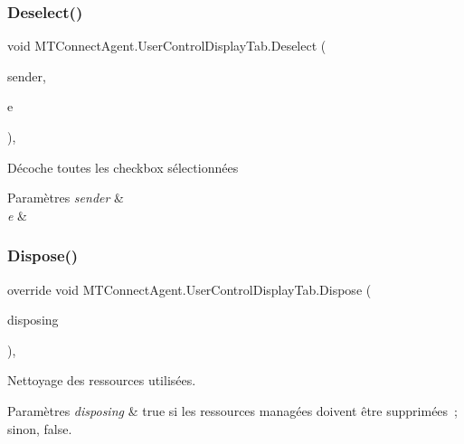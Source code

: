 \subsubsection{\texorpdfstring{Deselect()}{Deselect()}}
{\footnotesize\ttfamily void M\+T\+Connect\+Agent.\+User\+Control\+Display\+Tab.\+Deselect (\begin{DoxyParamCaption}\item[{object}]{sender,  }\item[{Mouse\+Event\+Args}]{e }\end{DoxyParamCaption})\hspace{0.3cm}{\ttfamily [inline]}, {\ttfamily [private]}}



Décoche toutes les checkbox sélectionnées 


\begin{DoxyParams}{Paramètres}
{\em sender} & \\
\hline
{\em e} & \\
\hline
\end{DoxyParams}
\mbox{\label{class_m_t_connect_agent_1_1_user_control_display_tab_a0cfe1921bf9282de4c87b7b3c68bf6e6}} 
\subsubsection{\texorpdfstring{Dispose()}{Dispose()}}
{\footnotesize\ttfamily override void M\+T\+Connect\+Agent.\+User\+Control\+Display\+Tab.\+Dispose (\begin{DoxyParamCaption}\item[{bool}]{disposing }\end{DoxyParamCaption})\hspace{0.3cm}{\ttfamily [inline]}, {\ttfamily [protected]}}



Nettoyage des ressources utilisées. 


\begin{DoxyParams}{Paramètres}
{\em disposing} & true si les ressources managées doivent être supprimées ; sinon, false.\\
\hline
\end{DoxyParams}
\mbox{\label{class_m_t_connect_agent_1_1_user_control_display_tab_ae8831a67e98923b77b22df4e35842a17}} 
